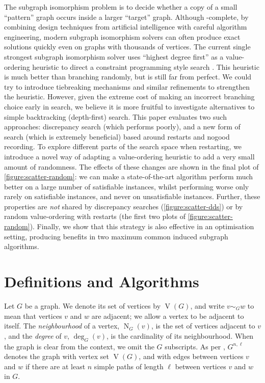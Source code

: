 \documentclass[letterpaper]{article} %
\newcommand{\neighbourhood}{\operatorname{N}}
\newcommand{\vertexset}{\operatorname{V}}
\newcommand{\citet}[1]{\citeauthor{#1} \shortcite{#1}}
\begin{document}
The subgraph isomorphism problem is to decide whether a copy of a small ``pattern'' graph occurs
inside a larger ``target'' graph. Although \NP-complete, by combining design techniques from
artificial intelligence with careful algorithm engineering, modern subgraph isomorphism solvers can
often produce exact solutions quickly even on graphs with thousands of vertices. The current single
strongest subgraph isomorphism solver uses ``highest degree first'' as a value-ordering heuristic to
direct a constraint programming style search
\cite{DBLP:conf/cp/McCreeshP15,DBLP:conf/lion/KotthoffMS16,DBLP:conf/ijcai/McCreeshPT16}. This
heuristic is much better than branching randomly, but is still far from perfect.  We could try to
introduce tiebreaking mechanisms and similar refinements to strengthen the heuristic. However, given
the extreme cost of making an incorrect branching choice early in search, we believe it is more
fruitful to investigate alternatives to simple backtracking (depth-first) search. This paper
evaluates two such approaches: discrepancy search (which performs poorly), and a new form of search
(which is extremely beneficial) based around restarts and nogood recording. To explore different
parts of the search space when restarting, we introduce a novel way of adapting a value-ordering
heuristic to add a very small amount of randomness. The effects of these changes are shown in the
final plot of \cref{figure:scatter-random}: we can make a state-of-the-art algorithm perform much
better on a large number of satisfiable instances, whilst performing worse only rarely on
satisfiable instances, and never on unsatisfiable instances.  Further, these properties are
\emph{not} shared by discrepancy searches (\cref{figure:scatter-dds}) or by random value-ordering
with restarts (the first two plots of \cref{figure:scatter-random}). Finally, we show that this
strategy is also effective in an optimisation setting, producing benefits in two maximum common
induced subgraph algorithms.

\section{Definitions and Algorithms}

Let $G$ be a graph. We denote its set of vertices by $\vertexset(G)$, and write $v \sim_G w$ to mean
that vertices $v$ and $w$ are adjacent; we allow a vertex to be adjacent to itself. The
\emph{neighbourhood} of a vertex, $\neighbourhood_G(v)$, is the set of vertices adjacent to $v$, and
the \emph{degree} of $v$, $\deg_G(v)$, is the cardinality of its neighbourhood. When the graph is clear from the context, we omit
the $G$ subscripts. As per \citet{DBLP:conf/aaai/HoffmannMR17}, $G^{n,\ell}$ denotes the graph with
vertex set $\vertexset(G)$, and with edges between vertices $v$ and $w$ if there are at least $n$
simple paths of length $\ell$ between vertices $v$ and $w$ in $G$.
\end{document}

